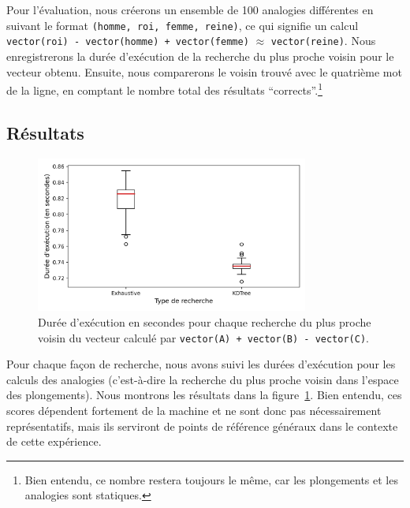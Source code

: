 \documentclass[12pt]{article}
\begin{document}

Pour l'évaluation, nous créerons un ensemble de 100 analogies différentes en suivant le format \texttt{(homme, roi, femme, reine)}, ce qui signifie un calcul \texttt{vector(roi) - vector(homme) + vector(femme)} $\approx$ \texttt{vector(reine)}. Nous enregistrerons la durée d'exécution de la recherche du plus proche voisin pour le vecteur obtenu. Ensuite, nous comparerons le voisin trouvé avec le quatrième mot de la ligne, en comptant le nombre total des résultats ``corrects''.\footnote{Bien entendu, ce nombre restera toujours le même, car les plongements et les analogies sont statiques.}

\subsection{Résultats} \label{résultats-2}

\begin{figure}[htpb]
    \centering
    \includegraphics[width=0.8\textwidth]{img/times.png}
    \caption{Durée d'exécution en secondes pour chaque recherche du plus proche voisin du vecteur calculé par \texttt{vector(A) + vector(B) - vector(C)}.}
    \label{fig:times}
\end{figure}

Pour chaque façon de recherche, nous avons suivi les durées d'exécution pour les calculs des analogies (c'est-à-dire la recherche du plus proche voisin dans l'espace des plongements). Nous montrons les résultats dans la figure~\ref{fig:times}. Bien entendu, ces scores dépendent fortement de la machine et ne sont donc pas nécessairement représentatifs, mais ils serviront de points de référence généraux dans le contexte de cette expérience. 
\end{document}
